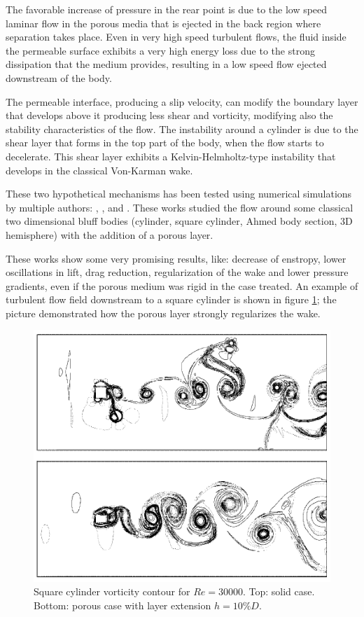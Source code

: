 The favorable increase of pressure in the rear point is due to the low speed laminar flow in the porous media that is ejected in the back region where separation takes place.
Even in very high speed turbulent flows, the fluid inside the permeable surface exhibits a very high energy loss due to the strong dissipation that the medium provides, resulting in a low speed flow ejected downstream of the body.

The permeable interface, producing a slip velocity, can modify the boundary layer that develops above it producing less shear and vorticity, modifying also the stability characteristics of the flow.
The instability around a cylinder is due to the shear layer that forms in the top part of the body, when the flow starts to decelerate.
This shear layer exhibits a Kelvin-Helmholtz-type instability that develops in the classical Von-Karman wake.

These two hypothetical mechanisms has been tested using numerical simulations by multiple authors: \citet{bruneau2004passive} \cite{bruneau2008numerical}, \citet{bhattacharyya2011reduction}, \citet{naito2012numerical} and \citet{mimeau2017passive}.
These works studied the flow around some classical two dimensional bluff bodies (cylinder, square cylinder, Ahmed body section, 3D hemisphere) with the addition of a porous layer.

These works show some very promising results, like: decrease of enstropy, lower oscillations in lift, drag reduction, regularization of the wake and lower pressure gradients, even if the porous medium was rigid in the case treated.
An example of turbulent flow field downstream to a square cylinder is shown in figure \ref{fig:porous_cylinder}; the picture demonstrated how the porous layer strongly regularizes the wake.

\begin{figure}[h]
	\centering
	\includegraphics[width=0.7\linewidth]{chapter_1/cylinder_porous}
	\caption{Square cylinder vorticity contour for $Re=30000$. Top: solid case. Bottom: porous case with layer extension $h=10\% D$.}
	\label{fig:porous_cylinder}
\end{figure}


